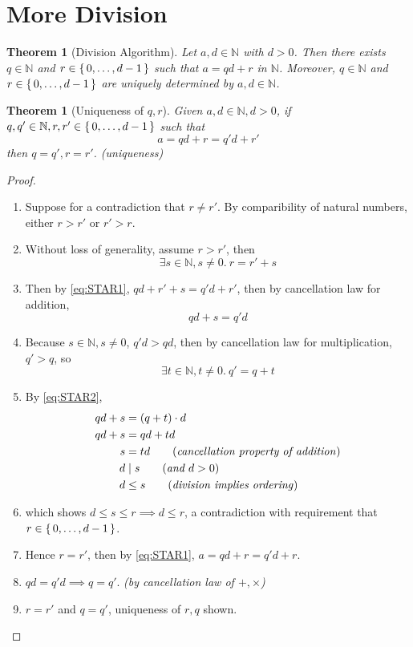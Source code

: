 \documentclass[12pt]{article}
\newenvironment{prf}
{
    \begin{proof}
        \hfill
        \begin{enumerate}[label*=\arabic*.]
                }
                {
                \hfill\qedsymbol
        \end{enumerate}
    \renewcommand{\qedsymbol}{}
    \end{proof}
}
\newcounter{dummy} \numberwithin{dummy}{section}
\numberwithin{equation}{dummy}
\newtheorem{theorem}[dummy]{Theorem}
\newtheorem*{dummythm}{Theorem}
\theoremstyle{definition}
\newcommand{\nat}{\mathbb{N}}
\newcommand{\by}[1]{\hfill \emph{(by #1)}}
\newcommand{\comment}[1]{\tag{\emph{#1}}}
\begin{document}
\section{More Division}
\begin{theorem}[Division Algorithm]
    Let $a,d \in \nat$ with $d>0$. Then there exists $q \in \nat$ and $r \in \set{0,\dots,d-1}$
    such that $a = qd+r$ in $\nat$.
    Moreover, $q\in\nat$ and $r\in\set{0,\dots,d-1}$ are uniquely determined by $a,d\in\nat$.
\end{theorem}
\begin{dummythm}[Uniqueness of $q,r$]
    Given $a, d \in \nat, d > 0$, if $q, q' \in \nat, r, r' \in \set{0,\dots,d-1}$ such that
    \begin{equation}
        a = qd + r = q'd + r'       \label{eq:STAR1}
    \end{equation}
    then $q=q', r=r'$. \emph{(uniqueness)}
\end{dummythm}
\begin{prf}
\item Suppose for a contradiction that $r \ne r'$. By comparibility of natural numbers, either $r > r'$ or $r' > r$.
\item Without loss of generality, assume $r > r'$, then
    $$\exists s\in\nat, s\ne0.~ r = r' + s$$ %
\item Then by \eqref{eq:STAR1}, $qd + r' + s = q'd + r'$,
    then by cancellation law for addition,
    \begin{equation}qd + s = q'd \label{eq:STAR2}\end{equation}
\item Because $s\in\nat, s\ne 0$, $q'd > qd$, then by cancellation law for multiplication, $q' > q$, so
    $$\exists t \in \nat, t\ne0.~ q' = q + t$$ %
\item By \eqref{eq:STAR2},
    \begin{align*}
        qd + s &= (q+t)\cdot d     \\
        qd + s &= qd + td  \\
        s &= td  \comment{cancellation property of addition}\\
        d&\mid s \comment{and $d > 0$}\\
        d &\le s \comment{division implies ordering}
    \end{align*}
\item which shows $d\leq s\leq r \implies d \leq r$, a contradiction with requirement that $r \in \set{0, \dots, d-1}$.
\item Hence $r = r'$, then by \eqref{eq:STAR1}, $a = qd + r = q'd + r$.
\item $qd = q'd \implies q = q'$. \by{cancellation law of $+, \times$}
\item $r = r'$ and $q = q'$, uniqueness of $r,q$ shown.
\end{prf}
\end{document}
